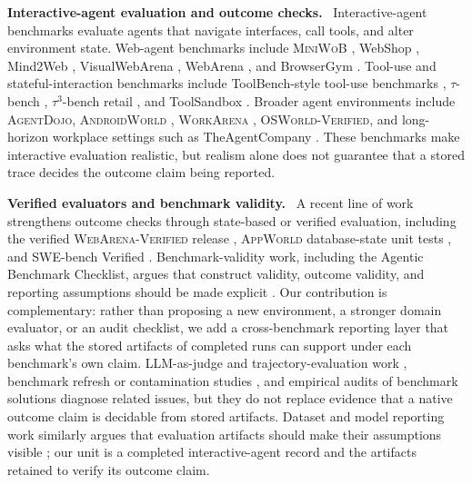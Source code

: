 \documentclass{article}
\newcommand{\agentdojo}{\textsc{AgentDojo}\xspace}
\newcommand{\appworld}{\textsc{AppWorld}\xspace}
\newcommand{\webarena}{\textsc{WebArena-Verified}\xspace}
\newcommand{\tauthree}{\(\tau^3\)-bench retail\xspace}
\newcommand{\androidworld}{\textsc{AndroidWorld}\xspace}
\newcommand{\miniwob}{\textsc{MiniWoB}\xspace}
\newcommand{\workarena}{\textsc{WorkArena}\xspace}
\newcommand{\osworld}{\textsc{OSWorld-Verified}\xspace}
\newcommand{\runin}[1]{\noindent\textbf{#1}\ }
\begin{document}
\runin{Interactive-agent evaluation and outcome checks.}
Interactive-agent benchmarks evaluate agents that navigate interfaces, call
tools, and alter environment state. Web-agent benchmarks include \miniwob
\citep{liu2018reinforcement}, WebShop \citep{yao2022webshop}, Mind2Web
\citep{deng2023mind2web}, VisualWebArena \citep{koh2024visualwebarena},
WebArena \citep{zhou2023webarena}, and BrowserGym
\citep{lesellierdechezelles2024browsergym}. Tool-use and
stateful-interaction benchmarks include ToolBench-style tool-use benchmarks
\citep{toolbench2024}, \(\tau\)-bench \citep{yao2024tau}, \tauthree
\citep{barres2026tau3bench}, and ToolSandbox \citep{lu2025toolsandbox}. Broader
agent environments include \agentdojo \citep{agentdojo}, \androidworld
\citep{rawles2025androidworlddynamicbenchmarkingenvironment}, \workarena
\citep{workarena2024}, \osworld \citep{osworld2024}, and long-horizon
workplace settings such as TheAgentCompany \citep{xu2024theagentcompany}.
These benchmarks make interactive evaluation realistic, but realism alone does
not guarantee that a stored trace decides the outcome claim being reported.

\runin{Verified evaluators and benchmark validity.}
A recent line of work strengthens outcome checks through state-based or
verified evaluation, including the verified \webarena release
\citep{elhattami2025webarena}, \appworld database-state unit tests
\citep{appworld2024}, and SWE-bench Verified \citep{swebenchverified2024}.
Benchmark-validity work, including the Agentic Benchmark Checklist, argues that
construct validity, outcome validity, and reporting assumptions should be made
explicit \citep{kang2025agenticbenchmarks}. Our contribution is complementary:
rather than proposing a new environment, a stronger domain evaluator, or an
audit checklist, we add a cross-benchmark reporting layer that asks what the
stored artifacts of completed runs can support under each benchmark's own
claim. LLM-as-judge and trajectory-evaluation work
\citep{zheng2023judging, shi2024judgingjudges, lu2025agentrewardbench},
benchmark refresh or contamination studies
\citep{kiela2021dynabench, guan2025benchmark, yang2023rethinkingcontamination},
and empirical audits of benchmark solutions \citep{wang2025solved,
openai2026swebenchverified} diagnose related issues, but they do not replace
evidence that a native outcome claim is decidable from stored artifacts.
Dataset and model reporting work similarly argues that evaluation artifacts
should make their assumptions visible \citep{gebru2021datasheets,
mitchell2019modelcards, ma2025sphere, pineau2021improvingreproducibility};
our unit is a completed interactive-agent record and the artifacts retained to
verify its outcome claim.
\end{document}
